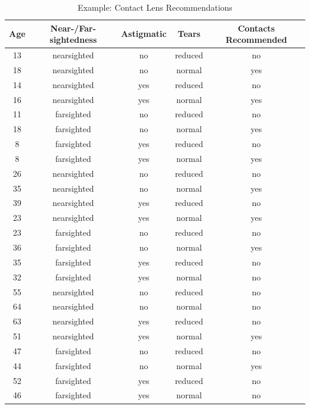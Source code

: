 \begin{table}[htb]
  \caption{Example: Contact Lens Recommendations \autocite{Chapman:2015}}
  \label{tab:c45trainingset} 
	\centering
	\footnotesize
	\begin{tabular}[c]{|c|c|c|c|c|}
	  \hline
		\textbf{Age}	&	\textbf{Near-/Far-sightedness}	&	\textbf{Astigmatic}	&	\textbf{Tears}	&	\textbf{Contacts Recommended} \\
		\hline \hline
		13	&	nearsighted	&	no	&	reduced	&	no \\
		\hline
		18	&	nearsighted	&	no	&	normal	&	yes \\
		\hline
		14	&	nearsighted	&	yes	&	reduced	&	no \\
		\hline
		16	&	nearsighted	&	yes	&	normal	&	yes \\
		\hline
		11	&	farsighted	&	no	&	reduced	&	no \\
		\hline
		18	&	farsighted	&	no	&	normal	&	yes \\
		\hline
		8	&	farsighted	&	yes	&	reduced	&	no \\
		\hline
		8	&	farsighted	&	yes	&	normal	&	yes \\
		\hline
		26	&	nearsighted	&	no	&	reduced	&	no \\
		\hline
		35	&	nearsighted	&	no	&	normal	&	yes \\
		\hline
		39	&	nearsighted	&	yes	&	reduced	&	no \\
		\hline
		23	&	nearsighted	&	yes	&	normal	&	yes \\
		\hline
		23	&	farsighted	&	no	&	reduced	&	no \\
		\hline
		36	&	farsighted	&	no	&	normal	&	yes \\
		\hline
		35	&	farsighted	&	yes	&	reduced	&	no \\
		\hline
		32	&	farsighted	&	yes	&	normal	&	no \\
		\hline
		55	&	nearsighted	&	no	&	reduced	&	no \\
		\hline
		64	&	nearsighted	&	no	&	normal	&	no \\
		\hline
		63	&	nearsighted	&	yes	&	reduced	&	no \\
		\hline
		51	&	nearsighted	&	yes	&	normal	&	yes \\
		\hline
		47	&	farsighted	&	no	&	reduced	&	no \\
		\hline
		44	&	farsighted	&	no	&	normal	&	yes \\
		\hline
		52	&	farsighted	&	yes	&	reduced	&	no \\
		\hline
		46	&	farsighted	&	yes	&	normal	&	no \\
	  \hline
	\end{tabular}
\end{table}

